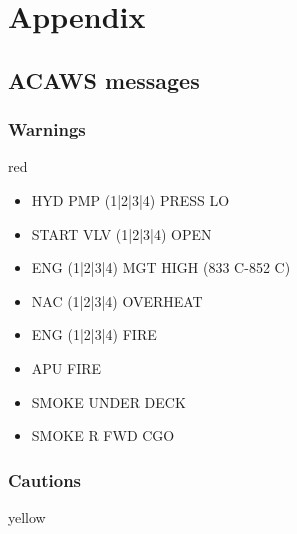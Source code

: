 \part{Appendix}

\chapter{ACAWS messages}
\label{sec:acaws-messages}

\section{Warnings}
red

\begin{itemize}
\item HYD PMP (1|2|3|4) PRESS LO
\item START VLV (1|2|3|4) OPEN
\item ENG (1|2|3|4) MGT HIGH (833 C-852 C)
\item NAC (1|2|3|4) OVERHEAT
\item ENG (1|2|3|4) FIRE
\item APU FIRE
\item SMOKE UNDER DECK
\item SMOKE R FWD CGO
\end{itemize}

\section{Cautions}
yellow


